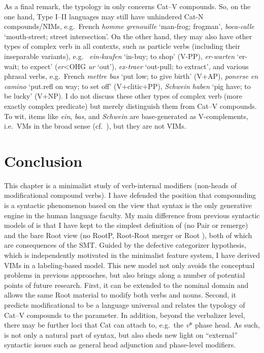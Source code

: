 \documentclass[output=paper]{langsci/langscibook}
\begin{document}
As a final remark, the typology in  only concerns Cat--V
compounds. So, on the one hand, Type I--II languages may still have unhindered
Cat-N compounds/NIMs, e.g.\ French {\it homme grenouille} `man-frog;
frogman',  {\it boca-calle} `mouth-street; street intersection'. On the
other hand, they may also have other types of complex verb in all contexts,
such as particle verbs (including their inseparable variants), e.g.\ 
{\it ein-kaufen} `in-buy; to shop' (V-PP), {\it er-warten} `{\sc er}-wait; to
expect' ({\it er}<OHG {\it ur} `out'),  {\it ex-traer} `out-pull; to
extract', and various phrasal verbs, e.g.\ French {\it mettre bas} `put low; to
give birth' (V+AP),  {\it ponerse en camino} `put.{\sc refl} on way; to
set off' (V+clitic+PP),  {\it Schwein haben} `pig have; to be lucky'
(V+NP). I do not discuss these other types of complex verb (more exactly
complex predicate) but merely distinguish them from Cat--V compounds. To wit,
items like {\it ein}, {\it bas}, and {\it Schwein} are base-generated as
V-complements, i.e.\ \glspl{VM} in the broad sense (cf.\ ), but they
are not \glspl{VIM}.

\section{Conclusion}\label{sec6}

This chapter is a minimalist study of verb-internal modifiers (non-heads of
modificational compound verbs). I have defended the position that compounding
is a syntactic phenomenon based on the view that syntax is the only generative
engine in the human language faculty. My main difference from previous
syntactic models of  is that I have kept to the simplest definition
of  (no Pair  or remerge) and the bare Root view (no RootP, Root-Root
merger or Root ), both of which are consequences of the \gls{SMT}.
Guided by the defective categorizer hypothesis, which is independently
motivated in the minimalist feature system, I have derived \glspl{VIM} in a
labeling-based model. This new model not only avoids the conceptual problems in
previous approaches, but also brings along a number of potential points of
future research. First, it can be extended to the nominal domain and allows the
same Root material to modify both verbs and nouns. Second, it predicts
modificational  to be a language universal and relates the typology
of Cat--V compounds to the  parameter. In addition, beyond the
verbalizer level, there may be further loci that Cat can attach to, e.g.\ the
{\em v}* phase head. As such,  is not only a natural part of syntax,
but also sheds new light on ``external'' syntactic issues such as general head
adjunction and phase-level modifiers.
\end{document}
